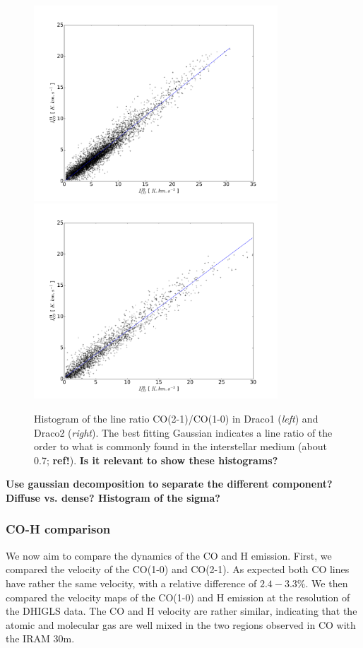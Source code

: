 \documentclass[traditabstract]{aa}
\begin{document}
\begin{figure}[h!]
  \centering
  \includegraphics[page=2,height=7.3cm,trim=60 30 90 75,clip=true]{Figures/Draco1_CO21-CO10.pdf}
  \hspace{3mm}
  \includegraphics[page=2,height=7.3cm,trim=70 30 90 75,clip=true]{Figures/Draco2_CO21-CO10.pdf}
  \caption{\label{ratio} Histogram of the line ratio CO(2-1)/CO(1-0) in Draco1 (\emph{left}) and Draco2 (\emph{right}). The best fitting Gaussian indicates a line ratio of the order to what is commonly found in the interstellar medium (about 0.7; \textbf{ref!}). \textbf{Is it relevant to show these histograms?}}
\end{figure}

\textbf{Use gaussian decomposition to separate the different component? Diffuse vs. dense? Histogram of the sigma?}


      \subsubsection{CO-H comparison}

   We now aim to compare the dynamics of the CO and H emission. First, we compared the velocity of the CO(1-0) and CO(2-1). As expected both CO lines have rather the same velocity, with a relative difference of $2.4-3.3\%$. We then compared the velocity maps of the CO(1-0) and H emission at the resolution of the DHIGLS data. The CO and H velocity are rather similar, indicating that the atomic and molecular gas are well mixed in the two regions observed in CO with the IRAM 30m.
\end{document}

